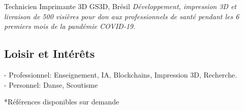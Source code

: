 \documentclass[letterpaper]{twentysecondcv_fr} %
\begin{document}
\begin{twenty} %
						{Technicien Imprimante 3D}
						{GS3D, Brésil}
						{\emph{Développement, impression 3D et livraison de 500 visières 
						pour don aux professionnels de santé pendant les 6 premiers mois de 
						la pandémie COVID-19.}}

\end{twenty}



\subsection{Loisir et Intérêts}

- Professionnel: Enseignement, IA, Blockchains, Impression 3D, Recherche.\\
- Personnel: Danse, Scoutisme

*Références disponibles sur demande
\end{document}
